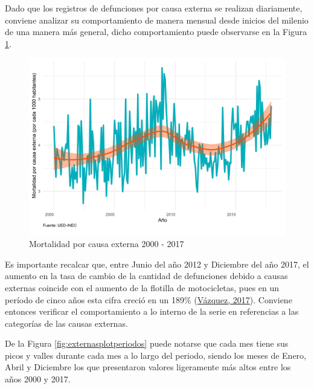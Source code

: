 \documentclass[
]{article}
\begin{document}
Dado que los registros de defunciones por causa externa se realizan
diariamente, conviene analizar su comportamiento de manera mensual desde
inicios del milenio de una manera más general, dicho comportamiento
puede observarse en la Figura \ref{fig:externaplotgeneral}.

\begin{figure}[H]
\includegraphics[width=1\linewidth,height=1\textheight]{Tesis_files/figure-latex/externaplotgeneral-1} \caption{Mortalidad por causa externa 2000 - 2017}\label{fig:externaplotgeneral}
\end{figure}

Es importante recalcar que, entre Junio del año 2012 y Diciembre del año
2017, el aumento en la tasa de cambio de la cantidad de defunciones
debido a causas externas coincide con el aumento de la flotilla de
motocicletas, pues en un período de cinco años esta cifra creció en un
189\% (\protect\hyperlink{ref-motos}{Vázquez, 2017}). Conviene entonces
verificar el comportamiento a lo interno de la serie en referencias a
las categorías de las causas externas.

De la Figura \ref{fig:externasplotperiodos} puede notarse que cada mes
tiene sus picos y valles durante cada mes a lo largo del periodo, siendo
los meses de Enero, Abril y Diciembre los que presentaron valores
ligeramente más altos entre los años 2000 y 2017.
\end{document}
